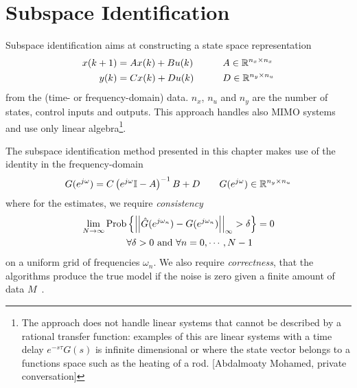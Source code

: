 \chapter{Subspace Identification}
\label{chap:subspace-identification}

Subspace identification aims at constructing a state space representation
\begin{equation}
  \label{eq:state-space-representation}
  \begin{aligned}
    x(k+1) &= Ax(k) + Bu(k) & \hspace{2em} & A \in \mathbb{R}^{n_x\times n_x} \\
    y(k) &= Cx(k) + Du(k) & & D \in \mathbb{R}^{n_y\times n_u}
  \end{aligned}
\end{equation}
from the (time- or frequency-domain) data. $n_x$, $n_u$ and $n_y$ are the number of states, control inputs and outputs. This approach handles also MIMO systems and use only linear algebra\footnote{The approach does not handle linear systems that cannot be described by a rational transfer function: examples of this are linear systems with a time delay $e^{-s\tau}G(s)$ is infinite dimensional or where the state vector belongs to a functions space such as the heating of a rod. [Abdalmoaty Mohamed, private conversation]}.

The subspace identification method presented in this chapter makes use of the identity in the frequency-domain
\begin{equation*}
  G(e^{j\omega}) = C\left(e^{j\omega} \mathbb{I} - A\right)^{-1}B + D\hspace{2em} G(e^{j\omega}) \in \mathbb{R}^{n_y\times n_u}
\end{equation*}
where for the estimates, we require \emph{consistency}
\begin{equation*}
  \begin{aligned}
    \lim_{N\rightarrow \infty} \text{Prob} & \left\{\left|\left|\hat{G}(e^{j\omega_n}) - G(e^{j\omega_n}) \right|\right|_\infty > \delta\right\} = 0 \\
                                           & \forall \delta>0 \text{ and } \forall n=0,\cdots,N-1
  \end{aligned}
\end{equation*}
on a uniform grid of frequencies $\omega_n$. We also require \emph{correctness}, that the algorithms produce the true model if the noise is zero given a finite amount of data $M$~\cite{mckelvey}.

